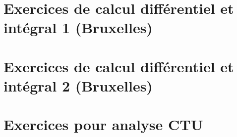\documentclass[a4paper,twoside,11pt]{book}
\begin{document}




\chapter{Exercices de calcul différentiel et intégral 1 (Bruxelles)}


 
\chapter{Exercices de calcul différentiel et intégral 2 (Bruxelles)}




\chapter{Exercices pour analyse CTU}





\emptyInputPath
{}
 
\end{document}
